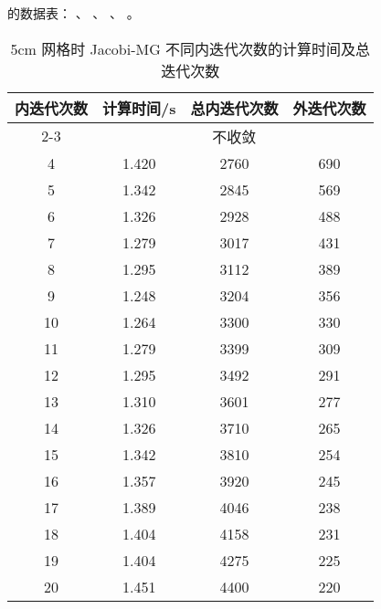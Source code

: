 \begin{datasheet}
的数据表：
、
、
、
。

\begin{table}
\centering
\caption{5cm 网格时 Jacobi-MG 不同内迭代次数的计算时间及总迭代次数}
\label{tab:equsolve.iter.jacobi-mg.5cm}
\begin{tabular}{cccc}
\toprule
内迭代次数 & 计算时间/s & 总内迭代次数 & 外迭代次数\\
\midrule
2-3 & \multicolumn{3}{c}{不收敛} \\ %
4 & 1.420 & 2760 & 690\\
5 & 1.342 & 2845 & 569\\
6 & 1.326 & 2928 & 488\\
7 & 1.279 & 3017 & 431\\
8 & 1.295 & 3112 & 389\\
9 & 1.248 & 3204 & 356\\
10 & 1.264 & 3300 & 330\\
11 & 1.279 & 3399 & 309\\
12 & 1.295 & 3492 & 291\\
13 & 1.310 & 3601 & 277\\
14 & 1.326 & 3710 & 265\\
15 & 1.342 & 3810 & 254\\
16 & 1.357 & 3920 & 245\\
17 & 1.389 & 4046 & 238\\
18 & 1.404 & 4158 & 231\\
19 & 1.404 & 4275 & 225\\
20 & 1.451 & 4400 & 220\\
\bottomrule
\end{tabular}
\end{table}


\end{datasheet}
